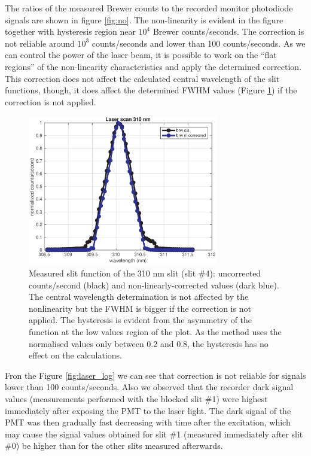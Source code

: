 \documentclass[acp, manuscript]{copernicus}
\begin{document}
The ratios of the measured Brewer counts to the recorded monitor photodiode signals are shown in figure  \ref{fig:no}. The non-linearity is evident in the figure together with hysteresis region near $10^4$  Brewer counts/seconds. The correction is not reliable  around $10^3$ counts/seconds and lower than 100 counts/seconds. As we can control the power of the laser beam, it is possible to work on the “flat regions” of the non-linearity characteristics and apply the determined correction. This correction does not affect the calculated central wavelength of the slit functions, though, it does affect the determined FWHM values (Figure \ref{fig:slitcor}) if the correction is not applied.
\begin{figure}[t]
\includegraphics[width=8.3cm]{figures/General_Corrected_vs_uncorrected.eps}
\caption{Measured slit function of the 310 nm slit (slit \#4): uncorrected counts/second (black) and non-linearly-corrected values (dark blue). The central wavelength determination is not affected by the nonlinearity but the FWHM is bigger if the correction is not applied. The hysteresis is evident from the asymmetry of the function at the low values region of the plot. As the method uses the normalised values only between 0.2 and 0.8, the hysteresis has no effect on the calculations.}
\label{fig:slitcor}
\end{figure}
Fron the Figure \ref{fig:laser_log} we can see that correction is not reliable for signals lower than 100 counts/seconds. Also we observed that the recorder dark signal values (measurements performed with the blocked slit \#1) were highest immediately after exposing the PMT to the laser light. The dark signal of the PMT was then gradually fast decreasing with time after the excitation, which may cause the signal values obtained for slit \#1 (measured immediately after slit \#0) be higher than for the other slits measured afterwards.
\end{document}
